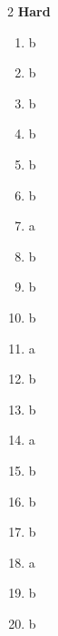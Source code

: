 \documentclass[12pt,a4paper]{exam}
\begin{document}
\begin{multicols}{2}
	\textbf{Hard}

	\begin{enumerate}[
			label=\arabic*.,
			leftmargin=*,
			itemsep=2pt,
			start=41
		]
		\item b
		\item b
		\item b
		\item b
		\item b
		\item b
		\item a
		\item b
		\item b
		\item b
		\item a
		\item b
		\item b
		\item a
		\item b
		\item b
		\item b
		\item a
		\item b
		\item b
	\end{enumerate}
\end{multicols}
\end{document}
